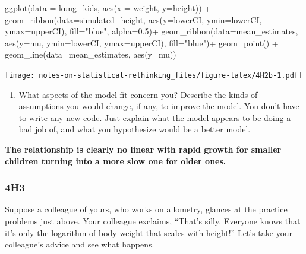 \documentclass[
]{book}
\newenvironment{Shaded}{\begin{snugshade}}{\end{snugshade}}
\newcommand{\AttributeTok}[1]{\textcolor[rgb]{0.77,0.63,0.00}{#1}}
\newcommand{\FloatTok}[1]{\textcolor[rgb]{0.00,0.00,0.81}{#1}}
\newcommand{\FunctionTok}[1]{\textcolor[rgb]{0.00,0.00,0.00}{#1}}
\newcommand{\NormalTok}[1]{#1}
\newcommand{\SpecialCharTok}[1]{\textcolor[rgb]{0.00,0.00,0.00}{#1}}
\newcommand{\StringTok}[1]{\textcolor[rgb]{0.31,0.60,0.02}{#1}}
\providecommand{\tightlist}{%
  \setlength{\itemsep}{0pt}\setlength{\parskip}{0pt}}
\begin{document}
\begin{Shaded}
\begin{Highlighting}[]
\FunctionTok{ggplot}\NormalTok{(}\AttributeTok{data =}\NormalTok{ kung\_kids, }\FunctionTok{aes}\NormalTok{(}\AttributeTok{x =}\NormalTok{ weight, }\AttributeTok{y=}\NormalTok{height)) }\SpecialCharTok{+} 
  \FunctionTok{geom\_ribbon}\NormalTok{(}\AttributeTok{data=}\NormalTok{simulated\_height, }\FunctionTok{aes}\NormalTok{(}\AttributeTok{y=}\NormalTok{lowerCI, }\AttributeTok{ymin=}\NormalTok{lowerCI, }\AttributeTok{ymax=}\NormalTok{upperCI), }\AttributeTok{fill=}\StringTok{"blue"}\NormalTok{, }\AttributeTok{alpha=}\FloatTok{0.5}\NormalTok{)}\SpecialCharTok{+}
  \FunctionTok{geom\_ribbon}\NormalTok{(}\AttributeTok{data=}\NormalTok{mean\_estimates, }\FunctionTok{aes}\NormalTok{(}\AttributeTok{y=}\NormalTok{mu, }\AttributeTok{ymin=}\NormalTok{lowerCI, }\AttributeTok{ymax=}\NormalTok{upperCI), }\AttributeTok{fill=}\StringTok{"blue"}\NormalTok{)}\SpecialCharTok{+}
  \FunctionTok{geom\_point}\NormalTok{() }\SpecialCharTok{+} 
  \FunctionTok{geom\_line}\NormalTok{(}\AttributeTok{data=}\NormalTok{mean\_estimates, }\FunctionTok{aes}\NormalTok{(}\AttributeTok{y=}\NormalTok{mu))}
\end{Highlighting}
\end{Shaded}

\texttt{[image: notes-on-statistical-rethinking\_files/figure-latex/4H2b-1.pdf]}

\begin{enumerate}
\def\labelenumi{\alph{enumi}.}
\setcounter{enumi}{2}
\tightlist
\item
  What aspects of the model fit concern you? Describe the kinds of assumptions you would
  change, if any, to improve the model. You don't have to write any new code. Just explain what the
  model appears to be doing a bad job of, and what you hypothesize would be a better model.
\end{enumerate}

\textbf{The relationship is clearly no linear with rapid growth for smaller children turning into a more slow one for older ones.}

\hypertarget{h3-2}{%
\subsubsection*{4H3}\label{h3-2}}

Suppose a colleague of yours, who works on allometry, glances at the practice problems just above. Your colleague exclaims, ``That's silly. Everyone knows that it's only the logarithm of body weight that scales with height!'' Let's take your colleague's advice and see what happens.
\end{document}
